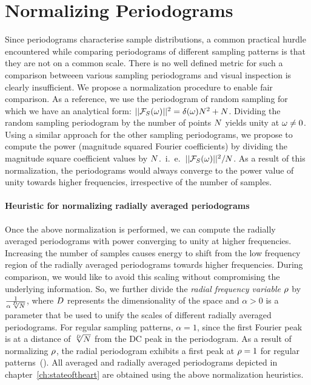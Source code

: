 \section{Normalizing Periodograms}
Since periodograms characterise sample distributions, a common practical hurdle encountered while comparing periodograms of different sampling patterns is that they are not on a common scale. There is no well defined metric for such a comparison betweeen various sampling periodograms and visual inspection is clearly insufficient. We propose a normalization procedure to enable fair comparison. 
As a reference, we use the periodogram of random sampling for which we have an analytical form: $||\mathcal{F}_{S}(\mathbf{\omega})||^2 = \delta(\omega) N^2 + N$. 
%
%
Dividing the random sampling periodogram by the number of points $N$ yields unity at $\omega\neq0$. 
Using a similar approach for the other sampling periodograms, we propose to compute the power (magnitude squared Fourier coefficients) by dividing the magnitude square coefficient values by $N$.~i.~e.~$||\mathcal{F}_{S}(\mathbf{\omega})||^2 / N$. As a result of this normalization, the periodograms would always converge to the power value of unity towards higher frequencies, irrespective of the number of samples. 


\paragraph{Heuristic for normalizing radially averaged periodograms} 
Once the above normalization is performed, we can compute the radially averaged periodograms with power converging to unity at higher frequencies. 
Increasing the number of samples causes energy to shift from the low frequency region of the radially averaged periodograms towards higher frequencies. 
During comparison, we would like to avoid this scaling without compromising the underlying information. So, we further divide the \emph{radial frequency variable $\rho$} by $\frac{1}{\alpha \sqrt[{D}]{N}}$, where ${D}$ represents the dimensionality of the space and $\alpha > 0$ is a parameter that be used to unify the scales of different radially averaged periodograms. For regular sampling patterns, $\alpha=1$, since the first Fourier peak  is at a distance of $\sqrt[{D}]{N}$ from the DC peak in the periodogram. As a result of normalizing $\rho$, the radial periodogram exhibits a first peak at $\rho=1$ for regular patterns~(). All averaged and radially averaged periodograms depicted in chapter~\ref{ch:stateoftheart} are obtained using the above normalization heuristics.

